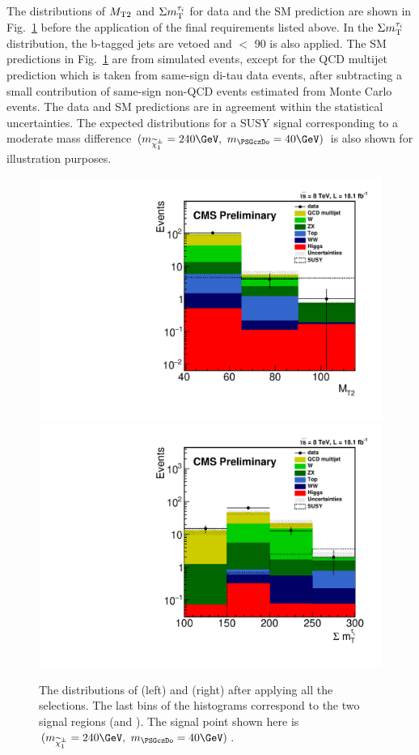 The distributions of ${M_{\rm T2}}$ and $\Sigma m_{\rm T}^{\tau_i}$ for data and the SM prediction
are shown in Fig.~\ref{fig:comparison} before the application of the final
requirements listed above.
In the $\Sigma m_{\rm T}^{\tau_i}$ distribution, the b-tagged jets are vetoed and \mttwo $<$ 90 \GeV is also applied.
The SM predictions in Fig.~\ref{fig:comparison} 
are from simulated events, except for the
QCD multijet prediction which is taken from same-sign di-tau data events,
after subtracting a small contribution of same-sign non-QCD events estimated from Monte Carlo events.
The data and SM predictions are in agreement within the statistical uncertainties.
The expected distributions for a SUSY signal 
corresponding to a moderate mass difference $(m_{\chione}=240\GeV,~m_{\PSGczDo}=40\GeV)$
is also shown for illustration purposes.
\begin{figure}[!Hhtb]
\centering
\includegraphics[angle=0,scale=0.375]{TauTauFigs/MT2_SSQCD.pdf}
\includegraphics[angle=0,scale=0.375]{TauTauFigs/SumMT_SSQCD.pdf} \\ 
\caption{The distributions of \mttwo (left) and \SumMT (right) after applying all the selections. 
The last bins of the histograms correspond to the two signal regions (\binone and \bintwo). The signal point shown here is $(m_{\chione}=240\GeV,~m_{\PSGczDo}=40\GeV)$.}
\label{fig:comparison}
\end{figure}
